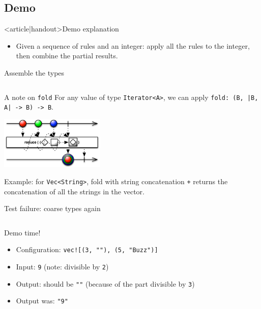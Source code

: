 \subsection{Demo}

\begin{frame}<article|handout>{Demo explanation}
  \begin{itemize}
  \item Given a sequence of rules and an integer: apply all the rules to the integer, then combine the partial results.
  \end{itemize}

\end{frame}

\begin{frame}[label=first-general,fragile]{Assemble the types}
  \inputminted{rust}{FizzBuzz5.rs}
\end{frame}

\begin{frame}[fragile]{A note on \texttt{fold}}
  For any value of type \texttt{Iterator<A>}, we can apply \texttt{fold: (B, |B, A| -> B) -> B}.
  \begin{center}
    \includegraphics[height=2.5cm]{reduce.png}
  \end{center}

  Example: for \texttt{Vec<String>}, fold with string concatenation \texttt{+} returns the concatenation of all the strings in the vector.
\end{frame}

\begin{frame}[fragile]{Test failure: coarse types again}
  \inputminted{console}{testQuick9.console}

  \begin{block}{Demo time!}
    \begin{itemize}
    \item Configuration: \texttt{vec![(3, ""), (5, "Buzz")]}
    \item Input: \texttt{9} (note: divisible by \texttt{2})
    \item Output: should be \texttt{""} (because of the part divisible by \texttt{3})
    \item Output was: \texttt{"9"}
    \end{itemize}
  \end{block}
\end{frame}

